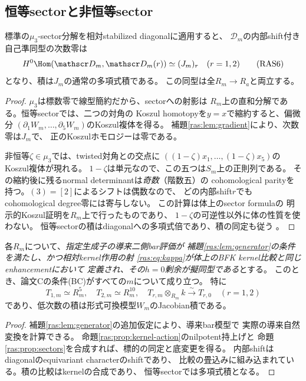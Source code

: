 \subsection{恒等sectorと非恒等sector}

\begin{proposition}[五変数の相対sector計算]\label{ras:prop:sectors}
標準の$\mu_3$-sector分解を相対stabilized diagonalに適用すると、
$\mathscr D_m$の内部shift付き自己準同型の次数零は
\[
 H^0\Hom(\mathscr D_m,\mathscr D_m(r))
 \simeq (J_m)_r\quad(r=1,2)
 \tag{RAS6}\label{ras:eq:sectors}
\]
となり、積は$J_m$の通常の多項式積である。
この同型は全$R_m\to R_a$と両立する。
\end{proposition}
\begin{proof}
$\mu_3$は標数零で線型簡約だから、sectorへの射影は
$R_m$上の直和分解である。恒等sectorでは、二つの対角の
Koszul homotopyを$y=x$で縮約すると、偏微分
$(\partial_1W_m,\ldots,\partial_5W_m)$のKoszul複体を得る。
補題\ref{ras:lem:gradient}により、次数零は$J_m$で、
正のKoszulホモロジーは零である。

非恒等$\zeta\in\mu_3$では、twisted対角との交点に
$((1-\zeta)x_1,\ldots,(1-\zeta)x_5)$のKoszul複体が現れる。
$1-\zeta$は単元なので、この五つは$S_m$上の正則列である。
その縮約後に残るnormal determinantは\emph{奇数}（階数五）の
cohomological parityを持つ。$(3)=[2]$によるシフトは偶数なので、
どの内部shift$r$でもcohomological degree零には寄与しない。
この計算は体上のsector formula\cite[Theorem~3.5]{RASLZ}の
明示的Koszul証明を$R_m$上で行ったものであり、
$1-\zeta$の可逆性以外に体の性質を使わない。
恒等sectorの積はdiagonalへの多項式倍であり、積の同定も従う
\cite[Remark~3.6]{RASLZ}。
\end{proof}

\begin{theorem}[相対kernel比較の下での(BC)]\label{ras:thm:bc}
各$R_m$について、\emph{指定生成子の導来二側bar評価が
補題\ref{ras:lem:generator}の条件を満たし、かつ相対kernel作用の射
\eqref{ras:eq:kappa}が体上のBFK kernel比較と同じenhancementにおいて
定義され、その$h=0$剰余が擬同型である}とする。
このとき、論文Cの条件(BC)がすべての$m$について成り立つ。
特に
\[
 T_{1,m}\simeq R_m^5,\quad T_{2,m}\simeq R_m^{10},\quad
 T_{r,m}\otimes_{R_m}k\xrightarrow{\sim}T_{r,0}\quad(r=1,2)
\]
であり、低次数の積は形式可換模型$W_m$のJacobian積である。
\end{theorem}
\begin{proof}
補題\ref{ras:lem:generator}の追加仮定により、導来bar模型で
実際の導来自然変換を計算できる。
命題\ref{ras:prop:kernel-action}のnilpotent持上げと
命題\ref{ras:prop:sectors}を合成すれば、標的の同定と底変更を得る。
内部shiftはdiagonalのequivariant characterのshiftであり、
比較の畳込みに組み込まれている。積の比較はkernelの合成であり、
恒等sectorでは多項式積となる。
\end{proof}

